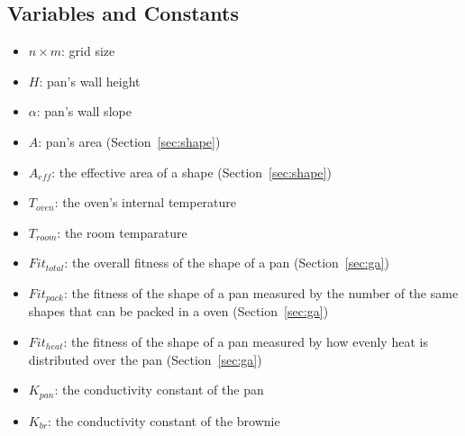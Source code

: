 \documentclass[12pt]{reedmcm}
\begin{document}
\subsection{Variables and Constants}
\begin{itemize}
  \item $n\times m$: grid size
  \item $H$: pan's wall height
  \item $\alpha$: pan's wall slope
  \item $A$: pan's area (Section~\ref{sec:shape})
  \item $A_{eff}$: the effective area of a shape (Section~\ref{sec:shape})
  \item $T_{oven}$: the oven's internal temperature
  \item $T_{room}$: the room temparature
  \item $Fit_{total}$: the overall fitness of the shape of a pan (Section~\ref{sec:ga})
  \item $Fit_{pack}$: the fitness of the shape of a pan measured by the number of the same shapes that can be packed in a oven (Section~\ref{sec:ga})
  \item $Fit_{heat}$: the fitness of the shape of a pan measured by how evenly heat is distributed over the pan (Section~\ref{sec:ga})
  \item $K_{pan}$: the conductivity constant of the pan
  \item $K_{br}$: the conductivity constant of the brownie
\end{itemize}
\end{document}
